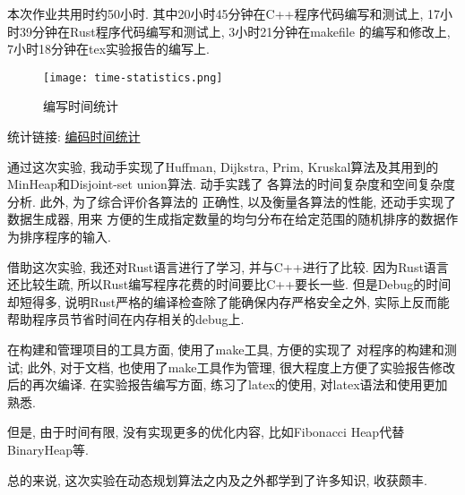 \label{ssub:实验心得}
本次作业共用时约50小时. 其中20小时45分钟在C++程序代码编写和测试上,
17小时39分钟在Rust程序代码编写和测试上, 3小时21分钟在makefile
的编写和修改上, 7小时18分钟在tex实验报告的编写上.\par
\begin{figure}[ht!]
	\begin{center}
		\texttt{[image: time-statistics.png]}
	\end{center}
	\caption{编写时间统计}
	\label{fig:screenTime}
\end{figure}
统计链接: \href{https://wakatime.com/@micuks/projects/uemupyroug?start=2022-11-26&end=2022-12-02}{编码时间统计}

通过这次实验, 我动手实现了Huffman, Dijkstra, Prim,
Kruskal算法及其用到的MinHeap和Disjoint-set union算法. 动手实践了
各算法的时间复杂度和空间复杂度分析. 此外, 为了综合评价各算法的
正确性, 以及衡量各算法的性能, 还动手实现了数据生成器, 用来
方便的生成指定数量的均匀分布在给定范围的随机排序的数据作为排序程序的输入.\par

借助这次实验, 我还对Rust语言进行了学习, 并与C++进行了比较.
因为Rust语言还比较生疏, 所以Rust编写程序花费的时间要比C++要长一些.
但是Debug的时间却短得多, 说明Rust严格的编译检查除了能确保内存严格安全之外,
实际上反而能帮助程序员节省时间在内存相关的debug上.\par

在构建和管理项目的工具方面, 使用了make工具, 方便的实现了
对程序的构建和测试; 此外, 对于文档, 也使用了make工具作为管理,
很大程度上方便了实验报告修改后的再次编译. 在实验报告编写方面,
练习了latex的使用, 对latex语法和使用更加熟悉.\par

但是, 由于时间有限, 没有实现更多的优化内容, 比如Fibonacci Heap代替BinaryHeap等.\par

总的来说, 这次实验在动态规划算法之内及之外都学到了许多知识, 收获颇丰.
